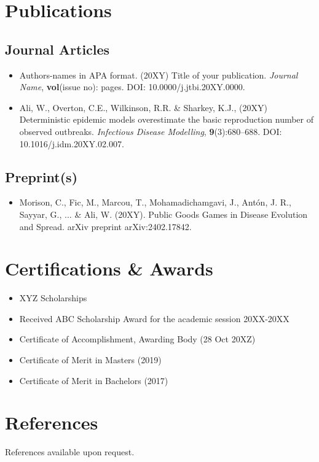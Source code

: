 \documentclass[11pt]{article}
\begin{document}
        \section{Publications}
     
    \subsection{Journal Articles}
    \begin{itemize}
        \item[\checkmark] Authors-names in APA format. (20XY) Title of your publication. \textit{Journal Name}, \textbf{vol}(issue no): pages. DOI: 10.0000/j.jtbi.20XY.0000. %
        \item[\checkmark] Ali, W., Overton, C.E., Wilkinson, R.R. \& Sharkey, K.J., (20XY) Deterministic epidemic models overestimate the basic reproduction number of observed outbreaks. \textit{Infectious Disease Modelling}, \textbf{9}(3):680–688. DOI: 10.1016/j.idm.20XY.02.007.
    \end{itemize}
    \subsection{Preprint(s)}
    \begin{itemize}
        \item[\checkmark] Morison, C., Fic, M., Marcou, T., Mohamadichamgavi, J., Antón, J. R., Sayyar, G., ... \& Ali, W. (20XY). Public Goods Games in Disease Evolution and Spread. arXiv preprint arXiv:2402.17842.
    \end{itemize}

      \section{Certifications \& Awards}
     \begin{itemize}
        \item[\checkmark] XYZ Scholarships
        \item[\checkmark] Received ABC Scholarship Award for the academic session 20XX-20XX
        \item[\checkmark] Certificate of Accomplishment, Awarding Body (28 Oct 20XZ)
        \item[\checkmark] Certificate of Merit in Masters (2019)
        \item[\checkmark] Certificate of Merit in Bachelors (2017)
    \end{itemize}
        \section{References}
    \textcolor{Sepia}{References available upon request.}
    
\end{document}
